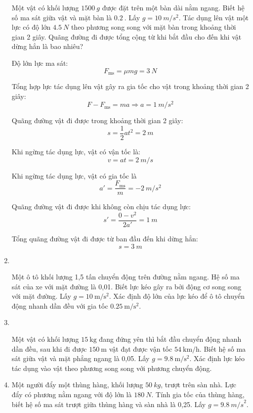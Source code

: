 \begin{enumerate}[label=\bfseries Bài \arabic*:]
	
	{Một vật có khối lượng $\SI{1500}{g}$ được đặt trên một bàn dài nằm ngang. Biết hệ số ma sát giữa vật và mặt bàn là $\SI{0.2}{}$. Lấy $g=\SI{10}{m/s^2}$. Tác dụng lên vật một lực có độ lớn $\SI{4.5}{N}$ theo phương song song với mặt bàn trong khoảng thời gian 2 giây. Quãng đường đi được tổng cộng từ khi bắt đầu cho đến khi vật dừng hẳn là bao nhiêu?
	}
	
	\hideall
	{
		Độ lớn lực ma sát:
		$$F_\text{ms} = \mu mg = \SI{3}{N}$$
		
		Tổng hợp lực tác dụng lên vật gây ra gia tốc cho vật trong khoảng thời gian 2 giây:
		$$F-F_\text{ms} = ma \Rightarrow a = \SI{1}{m/s^2}$$
		
		Quãng đường vật đi được trong khoảng thời gian 2 giây:
		$$s=\dfrac{1}{2}at^2 = \SI{2}{m}$$
		
		Khi ngừng tác dụng lực, vật có vận tốc là:
		$$v=at=\SI{2}{m/s}$$
		
		
		Khi ngừng tác dụng lực, vật có gia tốc là
		$$a'=\dfrac{F_\text{ms}}{m} = \SI{-2}{m/s^2}$$
		
		Quãng đường vật đi được khi không còn chịu tác dụng lực:
		$$s' = \dfrac{0-v^2}{2a'} = \SI{1}{m}$$
		
		Tổng quãng đường vật đi được từ ban đầu đến khi dừng hẳn:
		$$s=\SI{3}{m}$$
	}
	
	
	\item {}\\
	{Một ô tô khối lượng 1,5 tấn chuyển động trên đường nằm ngang. Hệ số ma sát của xe với mặt đường là 0,01. Biết lực kéo gây ra bởi động cơ song song với mặt đường. Lấy $g=\SI{10}{\meter/\second^2}$. Xác định độ lớn của lực kéo để ô tô chuyển động nhanh dần đều với gia tốc $\SI{0.25}{\meter/\second^2}$.
	
}

\item{}\\
{Một vật có khối lượng $\SI{15}{\kilogram}$ đang đứng yên thì bắt đầu chuyển động nhanh dần đều, sau khi đi được $\SI{150}{\meter}$ vật đạt được vận tốc $\SI{54}{\kilo\meter/\hour}$. Biết hệ số ma sát giữa vật và mặt phẳng ngang là 0,05. Lấy $g=\SI{9.8}{\meter/\second^2}$. Xác định lực kéo tác dụng vào vật theo phương song song với phương chuyển động.

}
\item {}

{
	Một người đẩy một thùng hàng, khối lượng $\SI{50}{kg}$, trượt trên sàn nhà. Lực đẩy có phương nằm ngang với độ lớn là $\SI{180}{N}$. Tính gia tốc của thùng hàng, biết hệ số ma sát trượt giữa thùng hàng và sàn nhà là 0,25. Lấy $g = \SI{9,8}{m/s}^2$.
}


\end{enumerate}
